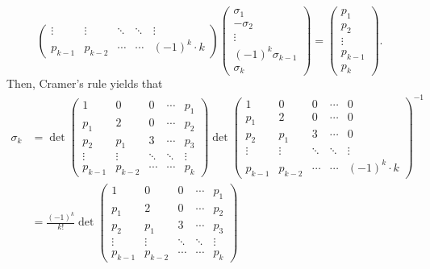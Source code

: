 \documentclass[letterpaper, 11pt, oneside]{book}
\begin{document}
\begin{pf}
\[\begin{pmatrix}
    \vdots & \vdots & \ddots & \ddots & \vdots \\
    p_{k - 1} & p_{k - 2} & \cdots & \cdots & (-1)^{k} \cdot k
  \end{pmatrix}
  \begin{pmatrix}
    \sigma_{1} \\
    -\sigma_{2} \\
    \vdots \\
    (-1)^{k} \sigma_{k - 1} \\
    \sigma_{k}
  \end{pmatrix}
  =
  \begin{pmatrix}
    p_{1} \\
    p_{2} \\
    \vdots \\
    p_{k - 1} \\
    p_{k}
  \end{pmatrix}.
\]
Then, Cramer's rule yields that
\begin{align*}
  \sigma_{k} &=
  \det
  \begin{pmatrix}
    1 & 0 & 0 & \cdots & p_{1} \\
    p_{1} & 2 & 0 & \cdots & p_{2} \\
    p_{2} & p_{1} & 3 & \cdots & p_{3} \\
    \vdots & \vdots & \ddots & \ddots & \vdots \\
    p_{k - 1} & p_{k - 2} & \cdots & \cdots & p_{k}
  \end{pmatrix}
  \det
  \begin{pmatrix}
    1 & 0 & 0 & \cdots & 0 \\
    p_{1} & 2 & 0 & \cdots & 0 \\
    p_{2} & p_{1} & 3 & \cdots & 0 \\
    \vdots & \vdots & \ddots & \ddots & \vdots \\
    p_{k - 1} & p_{k - 2} & \cdots & \cdots & (-1)^{k} \cdot k
  \end{pmatrix}^{-1} \\
    &= \frac{(-1)^{k}}{k!}
  \det
  \begin{pmatrix}
    1 & 0 & 0 & \cdots & p_{1} \\
    p_{1} & 2 & 0 & \cdots & p_{2} \\
    p_{2} & p_{1} & 3 & \cdots & p_{3} \\
    \vdots & \vdots & \ddots & \ddots & \vdots \\
    p_{k - 1} & p_{k - 2} & \cdots & \cdots & p_{k}
  \end{pmatrix} \\

\end{align*}
\end{pf}
\end{document}

